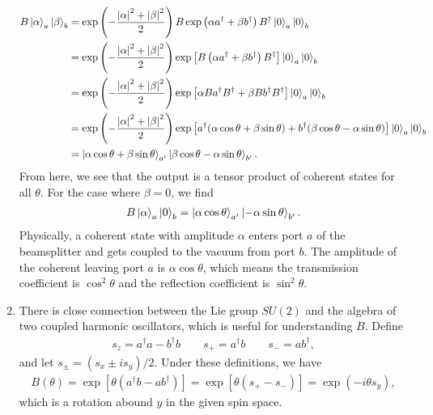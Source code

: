\documentclass{article}
\theoremstyle{definition}
\newcommand{\al}{\alpha}
\newcommand{\be}{\beta}
\newcommand{\f}[2]{\frac{#1}{#2}}
\newcommand{\lp}{\left(}
\newcommand{\rp}{\right)}
\newcommand{\lb}{\left[}
\newcommand{\rb}{\right]}
\begin{document}
\begin{enumerate}[label=\alph*)]
\begin{align*}
B \ket{\al}_a \ket{\be}_b
&= \exp\lp -\f{\abs{\al}^2 + \abs{\be}^2}{2} \rp B \exp\lp \al a^\dagger + \be b^\dagger \rp B^\dagger \ket{0}_a \ket{0}_b \\
&= \exp\lp -\f{\abs{\al}^2 + \abs{\be}^2}{2} \rp \exp\lb B \lp \al a^\dagger + \be b^\dagger \rp B^\dagger \rb  \ket{0}_a \ket{0}_b \\
&= \exp\lp -\f{\abs{\al}^2 + \abs{\be}^2}{2} \rp  \exp\lb \al Ba^\dagger B^\dagger  + \be B b^\dagger B^\dagger \rb \ket{0}_a \ket{0}_b \\
&= \exp\lp -\f{\abs{\al}^2 + \abs{\be}^2}{2} \rp 
\exp\lb a^\dagger(\al\cos\theta + \be\sin\theta) + b^\dagger (\be \cos\theta - \al\sin\theta) \rb \ket{0}_a \ket{0}_b \\
&= \ket{\al\cos\theta + \be\sin\theta}_{a'} \ket{ \be\cos\theta -\al\sin\theta }_{b'}.
\end{align*}
From here, we see that the output is a tensor product of coherent states for all $\theta$. For the case where $\be  =0$, we find 
\begin{align*}
B\ket{\al}_a \ket{0}_b = \ket{\al\cos\theta}_{a'} \ket{-\al\sin\theta }_{b'}.
\end{align*}
Physically, a coherent state with amplitude $\al$ enters port $a$ of the beamsplitter and gets coupled to the vacuum from port $b$. The amplitude of the coherent leaving port $a$ is $\al\cos\theta$, which means the transmission coefficient is $\cos^2\theta$ and the reflection coefficient is $\sin^2\theta$.

\item There is close connection between the Lie group $SU(2)$ and the algebra of two coupled harmonic oscillators, which is useful for understanding $B$. Define
\begin{align*}
s_z = a^\dagger a - b^\dagger b \quad\quad s_+ = a^\dagger b \quad\quad s_- = a b^\dagger, 
\end{align*}
and let $s_\pm = (s_x \pm i s_y)/2$. Under these definitions, we have
\begin{align*}
B(\theta) = \exp\lb \theta\lp a^\dagger b - ab^\dagger \rp \rb = \exp\lb \theta(s_+ - s_-) \rb = \exp(-i \theta s_y),
\end{align*}
which is a rotation abound $y$ in the given spin space. \\


\end{enumerate}
\end{document}
